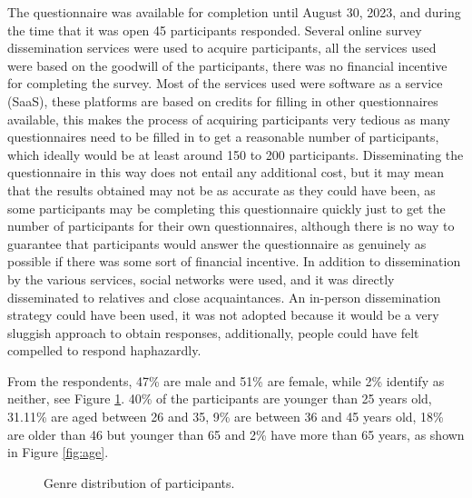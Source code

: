 The questionnaire was available for completion until August 30, 2023,
and during the time that it was open 45 participants responded.
Several online survey dissemination services were used to acquire participants,
all the services used were based on the goodwill of the participants, there
was no financial incentive for completing the survey. Most of the services
used were software as a service (SaaS), these platforms are based
on credits for filling in other questionnaires available, this makes the process
of acquiring participants very tedious as many questionnaires need to be
filled in to get a reasonable number of participants, which ideally would be
at least around 150 to 200 participants. Disseminating the questionnaire in this way does not
entail any additional cost, but it may mean that the results obtained
may not be as accurate as they could have been, as some participants may
be completing this questionnaire quickly just to get the number of participants
for their own questionnaires, although there is no way to guarantee that
participants would answer the questionnaire as genuinely as possible if there
was some sort of financial incentive. In addition to
dissemination by the various services, social networks were used, and it was
directly disseminated to relatives and close acquaintances.
An in-person dissemination strategy could have been used, it was not adopted
because it would be a very sluggish approach to obtain responses,
additionally, people could have felt compelled to respond haphazardly.

From the respondents, 47\% are male and 51\% are female, while 2\% identify
as neither, see Figure \ref{fig:genre}. 40\% of the participants are younger
than 25 years old, 31.11\% are aged between 26 and 35, 9\% are between
36 and 45 years old, 18\% are older than 46 but younger than 65 and 2\%
have more than 65 years, as shown in Figure \ref{fig:age}.

\begin{figure}[H]
    \begin{center}
        \caption{Genre distribution of participants.}
        \label{fig:genre}
    \end{center}
\end{figure}

